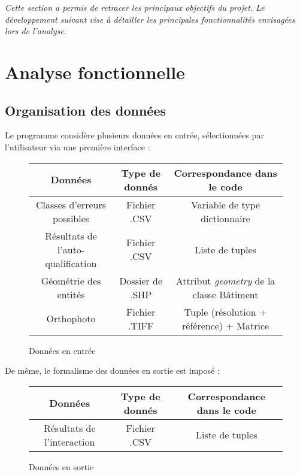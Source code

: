 \textit{Cette section a permis de retracer les principaux objectifs du projet. Le développement suivant vise à détailler les principales fonctionnalités envisagées lors de l'analyse.}

\section{Analyse fonctionnelle}

\subsection{Organisation des données}

Le programme considère plusieurs données en entrée, sélectionnées par l'utilisateur via une première interface :

\renewcommand{\arraystretch}{1.4}
\begin{figure}[!h]
	\begin{center}
		\begin{tabular}{|c|c|c|}
			\hline
			Données & Type de donnés & Correspondance dans le code \\
			\hline
			Classes d'erreurs possibles & Fichier .CSV & Variable de type dictionnaire \\
			Résultats de l'auto-qualification & Fichier .CSV & Liste de tuples \\
			Géométrie des entités & Dossier de .SHP & Attribut \textit{geometry} de la classe Bâtiment\\
			Orthophoto & Fichier .TIFF & Tuple (résolution + référence) + Matrice\\
			\hline
		\end{tabular}
	\end{center}
	\caption[Données en entrée]{Données en entrée}
	\label{tab:dataentre}
\end{figure}

\noindent De même, le formalisme des données en sortie est imposé :

\renewcommand{\arraystretch}{1.4}
\begin{figure}[!h]
	\begin{center}
		\begin{tabular}{|c|c|c|}
			\hline
			Données & Type de donnés & Correspondance dans le code \\
			\hline
			Résultats de l'interaction & Fichier .CSV & Liste de tuples \\
			\hline
		\end{tabular}
	\end{center}
	\caption[Données en sortie]{Données en sortie}
	\label{tab:datasortie}
\end{figure}

